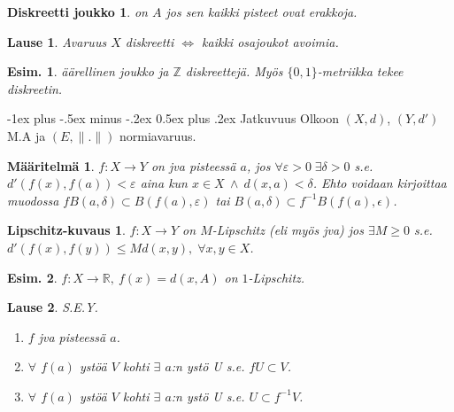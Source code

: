 \documentclass[landscape,a4paper,10pt]{article}
\makeatletter
\renewcommand{\section}{\@startsection{section}{1}{0mm}%
                                {-1ex plus -.5ex minus -.2ex}%
                                {0.5ex plus .2ex}%
                                {\color{red}\normalfont\large\bfseries}}
\theoremstyle{customtheoremstyle}
\newtheorem*{theorem}{Lause}
\newtheorem*{definition}{Määritelmä}
\newtheorem*{example}{Esim.}
\makeatother
\begin{document}
\begin{multicols*}{3}
\newtheorem*{diskjoukko}{Diskreetti joukko}
\begin{diskjoukko}
  on $A$ jos sen kaikki pisteet ovat erakkoja.
\end{diskjoukko}

\begin{theorem}
  Avaruus $X$ diskreetti $\iff$ kaikki osajoukot avoimia.
\end{theorem}

\begin{example}
  äärellinen joukko ja $\mathbb{Z}$ diskreettejä. Myös $\{0,1\}$-metriikka
  tekee diskreetin.
\end{example}

\section{Jatkuvuus}
Olkoon $(X,d)$, $(Y,d')$ M.A ja $(E,\|.\|)$ normiavaruus.

\begin{definition}
  $f: X \rightarrow Y$ on jva pisteessä $a$, jos $\forall \varepsilon > 0 \;
  \exists \delta > 0$ s.e. $d'(f(x),f(a)) < \varepsilon$ aina kun $x \in X \:
  \land \: d(x,a) < \delta$. Ehto voidaan kirjoittaa muodossa
  $f B(a,\delta) \subset B(f(a), \varepsilon)$ tai $B(a,\delta) \subset
  f^{-1} B(f(a),\epsilon)$.
\end{definition}

\newtheorem*{lipschitz}{Lipschitz-kuvaus}
\begin{lipschitz}
  $f: X \rightarrow Y$ on $M$-Lipschitz (eli myös jva) jos $\exists M \geq 0$ s.e.
  $d'(f(x),f(y)) \leq M d(x,y), \; \forall x,y \in X$.
\end{lipschitz}

\begin{example}
  $f: X \rightarrow \mathbb{R}, \: f(x) = d(x,A)$ on $1$-Lipschitz.
\end{example}

\begin{theorem}
  S.E.Y.
  \begin{enumerate}
    \item[(1)]{$f$ jva pisteessä $a$.}
    \item[(2)]{$\forall$ $f(a)$ ystöä $V$ kohti $\exists$ $a$:n ystö U s.e. $f
      U \subset V$.}
    \item[(3)]{$\forall$ $f(a)$ ystöä $V$ kohti $\exists$ $a$:n ystö U s.e. $U
      \subset f^{-1} V$.}
  \end{enumerate}
\end{theorem}


\end{multicols*}
\end{document}
